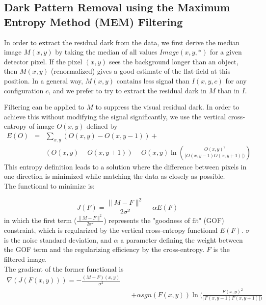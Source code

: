  

\subsection{Dark Pattern Removal using the Maximum Entropy Method (MEM) 
Filtering}

In order to extract the residual dark from the data, we first derive
the median image $M(x,y)$ by taking the median of all values
$Image(x,y,*)$ for a given detector pixel. If the pixel $(x,y)$ sees
 the background longer than an object, then $M(x,y)$ (renormalized)
gives a good estimate of the flat-field at this position.  In a
general way, $M(x,y)$ contains less signal than $I(x,y,c)$ for any
configuration $c$, and we prefer to try to extract the residual dark
in $M$ than in $I$.

Filtering can be applied to $M$ to suppress the visual residual
dark.  In order to achieve this without modifying the signal significantly, 
we use the vertical cross-entropy of image $O(x,y)$ defined
by
\begin{eqnarray}
E(O) & = & \sum_{x,y} (O(x,y) - O(x,y-1)) + \\ \nonumber
     &  & (O(x,y) - O(x,y+1)) - O(x,y) \ln( 
\frac{O(x,y)^2}{\mid O(x,y-1)O(x,y+1)\mid)})
\end{eqnarray}
This entropy definition leads to a solution where the difference between pixels
in one direction is minimized while  matching the data 
 as closely as possible. \\


The functional to minimize is:

\begin{equation}
J(F) = \frac{\parallel M - F \parallel^2}{2\sigma^2} - \alpha E(F)
\label{func}
\end{equation}
in which the first term ($\frac{\parallel M - F
\parallel^2}{2\sigma^2}$) represents the "goodness of fit" (GOF)
constraint, which is regularized by the vertical cross-entropy
functional ${E}(F)$. $\sigma$ is the noise standard deviation, and
$\alpha$ a parameter defining the weight between the GOF term and the
regularizing efficiency by the cross-entropy.  $F$ is the filtered
image. \\

The gradient of the former functional is 
\begin{eqnarray}
\nabla(J(F(x,y))) = - \frac{(M-F)(x,y)}{\sigma^2} \\ \nonumber
     &  &  + \alpha sgn(F(x,y)) \ln( 
\frac{F(x,y)^2}{\mid F(x,y-1)F(x,y+1)\mid) } 
\label{eq_grad}
\end{eqnarray}

